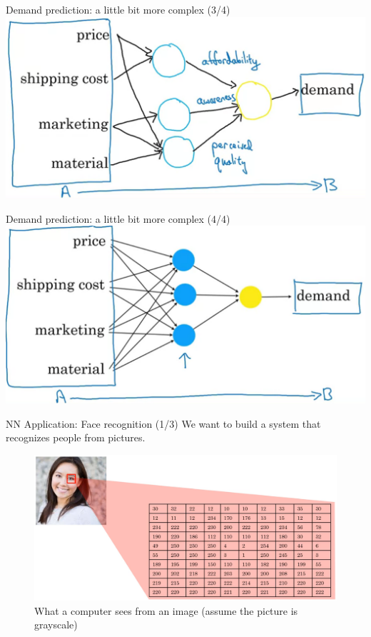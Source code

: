\documentclass[pdf]{beamer}
\theoremstyle{mystyle}
\begin{document}
\begin{frame}{Demand prediction: a little bit more complex (3/4)}
	\centering
	\includegraphics[scale=.275]{demand-prediction-nn-2.png}
\end{frame}

\begin{frame}{Demand prediction: a little bit more complex (4/4)}
	\centering
	\includegraphics[scale=.275]{demand-prediction-nn-3.png}
\end{frame}

\begin{frame}{NN Application: Face recognition (1/3)}
	We want to build a system that recognizes people from pictures.
	\begin{figure}[!ht]
		\centering
		\includegraphics[scale=.25]{face-recognition-intro}
		\caption{What a computer sees from an image (assume the picture is grayscale)~\citep{ng2019AIForEveryone}}
	\end{figure}
	
\end{frame}
\end{document}

